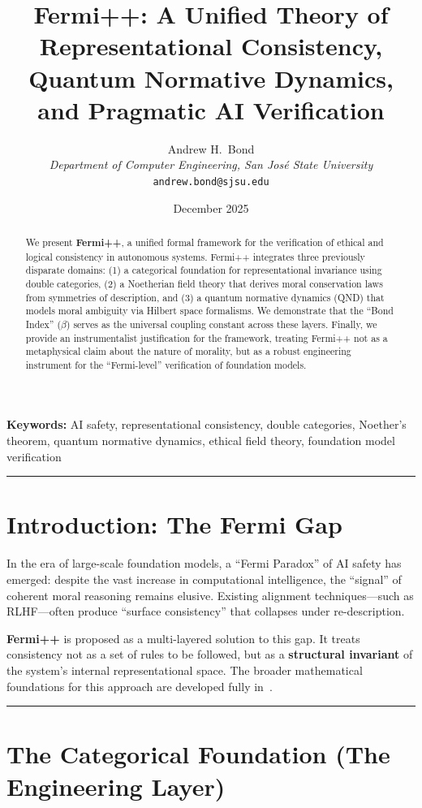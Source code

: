 \documentclass[12pt]{article}
\title{Fermi++: A Unified Theory of Representational Consistency, Quantum Normative Dynamics, and Pragmatic AI Verification}
\author{Andrew H.\ Bond\\
\textit{Department of Computer Engineering, San Jos\'{e} State University}\\
\texttt{andrew.bond@sjsu.edu}}
\date{December 2025}
\begin{document}
\maketitle

\noindent\textbf{Keywords:} AI safety, representational consistency, double categories, Noether's theorem, quantum normative dynamics, ethical field theory, foundation model verification

\begin{abstract}
We present \textbf{Fermi++}, a unified formal framework for the verification of ethical and logical consistency in autonomous systems. Fermi++ integrates three previously disparate domains: (1) a categorical foundation for representational invariance using double categories, (2) a Noetherian field theory that derives moral conservation laws from symmetries of description, and (3) a quantum normative dynamics (QND) that models moral ambiguity via Hilbert space formalisms. We demonstrate that the ``Bond Index'' ($\beta$) serves as the universal coupling constant across these layers. Finally, we provide an instrumentalist justification for the framework, treating Fermi++ not as a metaphysical claim about the nature of morality, but as a robust engineering instrument for the ``Fermi-level'' verification of foundation models.
\end{abstract}

\bigskip
\hrule
\bigskip

\section{Introduction: The Fermi Gap}

In the era of large-scale foundation models, a ``Fermi Paradox'' of AI safety has emerged: despite the vast increase in computational intelligence, the ``signal'' of coherent moral reasoning remains elusive. Existing alignment techniques---such as RLHF---often produce ``surface consistency'' that collapses under re-description.

\textbf{Fermi++} is proposed as a multi-layered solution to this gap. It treats consistency not as a set of rules to be followed, but as a \textbf{structural invariant} of the system's internal representational space. The broader mathematical foundations for this approach are developed fully in~\cite{bond2026ge}.

\bigskip
\hrule
\bigskip

\section{The Categorical Foundation (The Engineering Layer)}
\end{document}
